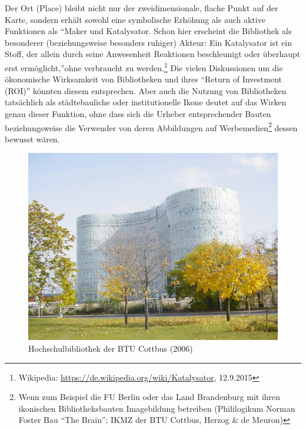 Der Ort (Place) bleibt nicht nur der zweidimensionale, flache Punkt auf
der Karte, sondern erhält sowohl eine symbolische Erhöhung als auch
aktive Funktionen als \enquote{Maker und Katalysator. Schon hier
erscheint die Bibliothek als besonderer (beziehungsweise besonders
ruhiger) Akteur: Ein Katalysator ist ein Stoff, der allein durch seine
Anwesenheit Reaktionen beschleunigt oder überhaupt erst ermöglicht,}ohne
verbraucht zu werden.\footnote{Wikipedia:
  \url{https://de.wikipedia.org/wiki/Katalysator}, 12.9.2015} Die vielen
Diskussionen um die ökonomische Wirksamkeit von Bibliotheken und ihres
\enquote{Return of Investment (ROI)} könnten diesem entsprechen. Aber auch die
Nutzung von Bibliotheken tatsächlich als städtebauliche oder
institutionelle Ikone deutet auf das Wirken genau dieser Funktion, ohne
dass sich die Urheber entsprechender Bauten beziehungsweise die
Verwender von deren Abbildungen auf Werbemedien\footnote{Wenn zum
  Beispiel die FU Berlin oder das Land Brandenburg mit ihren ikonischen
  Bibliotheksbauten Imagebildung betreiben (Phililogikum Norman Foster
  Bau \enquote{The Brain}; IKMZ der BTU Cottbus, Herzog \& de Meuron)} dessen
bewusst wären.

\begin{figure}[htbp]
\centering
\includegraphics{img/hobohm-2.jpg}
\caption{Hochschulbibliothek der BTU Cottbus (2006)}
\end{figure}

